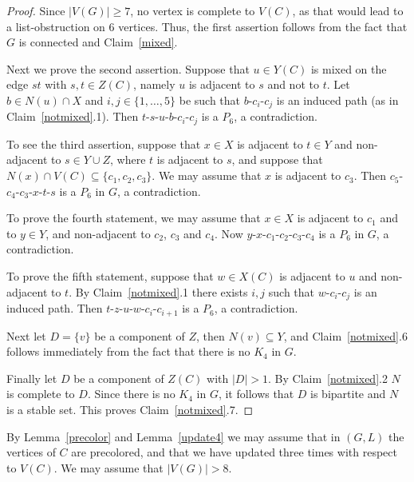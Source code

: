 \documentclass[11pt]{article}
\begin{document}
\begin{proof} 
Since $|V(G)| \ge 7$, no vertex is complete to $V(C)$, as that would lead to a list-obstruction on $6$ vertices.
Thus, the first assertion follows from the fact that $G$ is connected and
Claim~\ref{mixed}.

Next we prove the second assertion.
Suppose that $u\in Y(C)$ is mixed on the edge $st$ 
with $s,t \in Z(C) $, namely $u$ is adjacent to $s$ and not to $t$.   
Let $b\in N(u)\cap X$ and $i,j \in \{1,\ldots,5\}$ be such that $b$-$c_i$-$c_j$ is an induced path (as in Claim~\ref{notmixed}.1). 
Then $t$-$s$-$u$-$b$-$c_i$-$c_j$ is a $P_6$, a contradiction.

To see the third assertion, suppose that $x \in X$ is adjacent to $t \in Y$ and non-adjacent to $s \in Y \cup Z$, where $t$ is adjacent to $s$, and suppose that $N(x) \cap V(C) \subseteq \{c_1,c_2,c_3\}$. 
We may assume that $x$ is adjacent to $c_3$. 
Then $c_5$-$c_4$-$c_3$-$x$-$t$-$s$ is a $P_6$ in $G$, a contradiction.

To prove the fourth statement, we may assume that $x \in X$ is adjacent to $c_1$ and to $y \in Y$, and non-adjacent to $c_2$, $c_3$ and $c_4$.
Now $y$-$x$-$c_1$-$c_2$-$c_3$-$c_4$ is a $P_6$ in $G$, a contradiction.

To prove the fifth statement, suppose that $w \in X(C)$ is adjacent to $u$ and 
non-adjacent to $t$.
By Claim~\ref{notmixed}.1 there exists $i,j$ such that $w$-$c_i$-$c_j$ is an induced path.
Then $t$-$z$-$u$-$w$-$c_i$-$c_{i+1}$ is a $P_6$, a contradiction.


Next let  $D=\{v\}$ be a component of $Z$, then $N(v) \subseteq Y$,
and Claim~\ref{notmixed}.6 follows immediately from the fact that there is no $K_4$ in $G$.

	 
Finally let $D$ be a component of $Z(C)$ with $|D|>1$.
By Claim~\ref{notmixed}.2 $N$ is complete to $D$. Since there is no $K_4$
in $G$, it follows that $D$ is bipartite and $N$  is a  stable set. 
This proves Claim~\ref{notmixed}.7.
\end{proof}

By Lemma~\ref{precolor} and Lemma~\ref{update4} we may assume that in $(G,L)$ 
the vertices of $C$ are precolored, and that we have updated three times with respect to $V(C)$. We may assume that $|V(G)|>8$.
\end{document}
